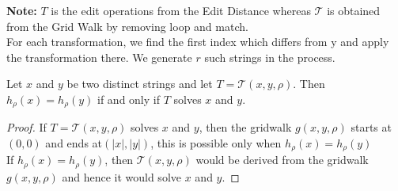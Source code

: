 \documentclass{article}
\begin{document}
\textbf{Note:} $T$ is the edit operations from the Edit Distance whereas $\mathcal{T}$
is obtained from the Grid Walk by removing loop and match.\\
For each transformation, we find the first index which differs from y and apply
the transformation there. We generate $r$ such strings in the process.\\

\begin{lem}
    Let $x$ and $y$ be two distinct strings and let $T=\mathcal{T}(x,y,\rho)$. Then 
    $h_\rho(x)=h_\rho(y)$ if and only if $T$ solves $x$ and $y$.
\end{lem}
\begin{proof}
    If $T=\mathcal{T}(x,y,\rho)$ solves $x$ and $y$, then the gridwalk $g(x,y,\rho)$
    starts at $(0,0)$ and ends at$(|x|,|y|)$, this is possible only when 
    $h_\rho(x)=h_\rho(y)$\\
    If $h_\rho(x)=h_\rho(y)$, then $\mathcal{T}(x,y,\rho)$ would be derived from
    the gridwalk $g(x,y,\rho)$ and hence it would solve $x$ and $y$.
\end{proof}
\end{document}
